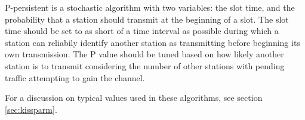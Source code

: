 \documentclass[12pt,letterpaper]{article}
\begin{document}
P-persistent is a stochastic algorithm with two variables: the slot time, and the
probability that a station should transmit at the beginning of a slot. The slot time
should be set to as short of a time interval as possible during which a station can
reliabily identify another station as transmitting 
before beginning its own transmission.
The P value should be tuned based on how likely another station is to transmit 
considering the number of other stations with 
pending traffic attempting to gain the channel.

For a discussion on typical values used in these algorithms, 
see section \ref{sec:kissparm}.
\end{document}
